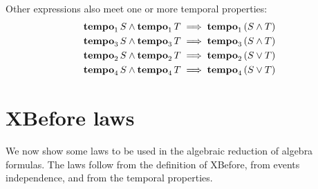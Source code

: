 Other expressions also meet one or more temporal properties:
\begin{subequations}
\begin{align}
\tempo[1]{S} \land \tempo[1]{T} & \implies \tempo[1]{\parsin{S \land T}}\label{law:tempo1-inter}\\
\tempo[3]{S} \land \tempo[3]{T} & \implies \tempo[3]{\parsin{S \land T}}\label{law:tempo3-inter}\\
\tempo[2]{S} \land \tempo[2]{T} & \implies \tempo[2]{\parsin{S \lor T}}\label{law:tempo2-union}\\
\tempo[4]{S} \land \tempo[4]{T} & \implies \tempo[4]{\parsin{S \lor T}}\label{law:tempo4-union}
\end{align}
\end{subequations}

\section[XBefore laws]{\acs*{XBefore} laws}
\label{sec:xbefore-laws}

We now show some laws to be used in the algebraic reduction of \ac{algebra} formulas.
The laws follow from the definition of \ac{XBefore}, from events independence, and from the temporal properties.


